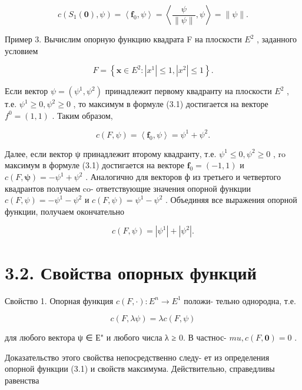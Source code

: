 \documentclass[8pt]{extarticle}
\begin{document}
\[
c\left( {{S}_{1}\left( \mathbf{0}\right) ,\psi }\right)  = \left\langle  {{\mathbf{f}}_{0},\psi }\right\rangle   = \left\langle  {\frac{\psi }{\parallel \psi \parallel },\psi }\right\rangle   = \parallel \psi \parallel . \tag{3.4}
\]

Пример 3. Вычислим опорную функцию квадрата F на плоскости \({E}^{2}\) , заданного условием

\[
F = \left\{  {\mathbf{x} \in  {E}^{2} : \left| {x}^{1}\right|  \leq  1,\left| {x}^{2}\right|  \leq  1}\right\}  .
\]

Если вектор \(\psi  = \left( {{\psi }^{1},{\psi }^{2}}\right)\) принадлежит первому квадранту на плоскости \({E}^{2}\) , т.е. \({\psi }^{1} \geq  0,{\psi }^{2} \geq  0\) , то максимум в формуле (3.1) достигается на векторе \({f}^{0} = \left( {1,1}\right)\) . Таким образом,

\[
c\left( {F,\psi }\right)  = \left\langle  {{\mathbf{f}}_{0},\psi }\right\rangle   = {\psi }^{1} + {\psi }^{2}.
\]

Далее, если вектор ψ принадлежит второму квадранту, т.е. \({\psi }^{1} \leq  0,{\psi }^{2} \geq  0\) , ro максимум в формуле (3.1) достигается на векторе \({\mathbf{f}}_{0} = \left( {-1,1}\right)\) и \(c\left( {F,\mathbf{\psi }}\right)  =  - {\psi }^{1} + {\psi }^{2}\) . Аналогично для векторов ф из третьего и четвертого квадрантов получаем co- ответствующие значения опорной функции \(c\left( {F,\psi }\right)  =  - {\psi }^{1} - {\psi }^{2}\) и \(c\left( {F,\psi }\right)  = {\psi }^{1} - {\psi }^{2}\) . Объединяя все выражения опорной функции, получаем окончательно

\[
c\left( {F,\psi }\right)  = \left| {\psi }^{1}\right|  + \left| {\psi }^{2}\right| . \tag{3.5}
\]

\section*{3.2. Свойства опорных функций}

Свойство 1. Опорная функция \(c\left( {F, \cdot  }\right)  : {E}^{n} \rightarrow  {E}^{1}\) положи- тельно однородна, т.е.

\[
c\left( {F,{\lambda \psi }}\right)  = {\lambda c}\left( {F,\psi }\right)
\]

для любого вектора ψ ∈ Е" и любого числа λ ≥ 0. В частнос- \({mu},c\left( {F,\mathbf{0}}\right)  = 0\) .

Доказательство этого свойства непосредственно следу- ет из определения опорной функции (3.1) и свойств максимума. Действительно, справедливы равенства
\end{document}
